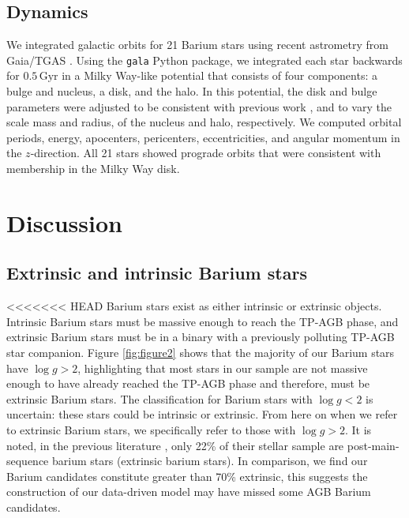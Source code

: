 \documentclass[a4paper,fleqn,usenatbib]{mnras}
\begin{document}
\subsection{Dynamics}
We integrated galactic orbits for 21 Barium stars using recent astrometry from Gaia/TGAS \citep{gaia2016a,gaia2016b}. Using the \texttt{gala} Python package, we integrated each star backwards for $0.5\,\textrm{Gyr}$ in a Milky Way-like potential that consists of four components: a \citet{hernquist1990} bulge and nucleus, a \citet{miyamoto1975} disk, and the \citet{nfw1997} halo. In this potential, the disk and bulge parameters were adjusted to be consistent with previous work \citep{bovy2015}, and to vary the scale mass and radius, of the nucleus and halo, respectively. We computed orbital periods, energy, apocenters, pericenters, eccentricities, and angular momentum in the $z$-direction. All 21 stars showed prograde orbits that were consistent with membership in the Milky Way disk.

\section{Discussion}  \label{sec:dis}


\subsection{Extrinsic and intrinsic Barium stars}
<<<<<<< HEAD
Barium stars exist as either intrinsic or extrinsic objects. Intrinsic Barium stars must be massive enough to reach the TP-AGB phase, and extrinsic Barium stars must be in a binary with a previously polluting TP-AGB star companion. Figure \ref{fig:figure2} shows that the majority of our Barium stars have $\log{g} > 2$, highlighting that most stars in our sample are not massive enough to have already reached the TP-AGB phase and therefore, must be extrinsic Barium stars. The classification for Barium stars with $\log{g} < 2$ is uncertain: these stars could be intrinsic or extrinsic. From here on when we refer to extrinsic Barium stars, we specifically refer to those with $\log{g} > 2$. It is noted, in the previous literature \citet{van2017}, only 22\% of their stellar sample are post-main-sequence barium stars (extrinsic barium stars). In comparison, we find our Barium candidates constitute greater than 70\% extrinsic, this suggests the construction of our data-driven model may have missed some AGB Barium candidates.
\end{document}
